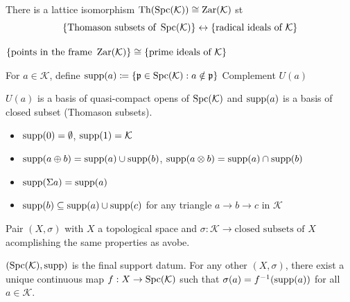 \begin{proposition} There is a lattice isomorphism $\operatorname{Th}(\operatorname{Spc}(\mathcal{K})) \cong \operatorname{Zar}(\mathcal{K})$ st
\[
\{\text{Thomason subsets of }\operatorname{Spc}(\mathcal{K})\} \leftrightarrow \{\text{radical ideals of }\mathcal{K}\}
\]
\end{proposition}

\begin{proposition} $ \{\text{points in the frame }\operatorname{Zar}(\mathcal{K})\} \cong \{\text{prime ideals of }\mathcal{K}\} $
\end{proposition}

\begin{definition}[Support] For $a \in \mathcal{K} $, define $\operatorname{supp} (a) \coloneqq \{\mathfrak{p} \in \operatorname{Spc}(\mathcal{K}) : a \notin \mathfrak{p} \}$ 
Complement $U(a)$ 
\end{definition}

\begin{proposition} $U(a)$ is a basis of quasi-compact opens of $\operatorname{Spc}(\mathcal{K})$ and $\operatorname{supp}(a)$ is a basis of closed subset (Thomason subsets). 
\begin{itemize}[topsep=-6pt, itemsep=0pt]
    \item $\operatorname{supp} (0) = \emptyset$, $\operatorname{supp} (1) = \mathcal{K} $ 
    \item $\operatorname{supp} (a \oplus b) = \operatorname{supp} (a) \cup \operatorname{supp} (b)$, $\operatorname{supp} (a \otimes b) = \operatorname{supp} (a) \cap \operatorname{supp} (b)$
    \item $\operatorname{supp} (\Sigma a) = \operatorname{supp} (a)$
    \item $\operatorname{supp} (b) \subseteq \operatorname{supp}(a) \cup \operatorname{supp}(c)$ for any triangle $a \to b \to c$ in $\mathcal{K} $
\end{itemize}
\end{proposition}

\begin{definition} Pair $(X, \sigma)$ with $X$ a topological space and $\sigma : \mathcal{K}  \to \text{closed subsets of }X$ acomplishing the same properties as avobe.
\end{definition}

\begin{theorem} $(\operatorname{Spc}(\mathcal{K}), \operatorname{supp})$ is the final support datum. For any other $(X, \sigma)$, there exist a unique continuous map $f: X \to \operatorname{Spc}(\mathcal{K})$ such that $\sigma(a) = f^{-1}(\operatorname{supp}(a))$ for all $a \in \mathcal{K}$.
\end{theorem}